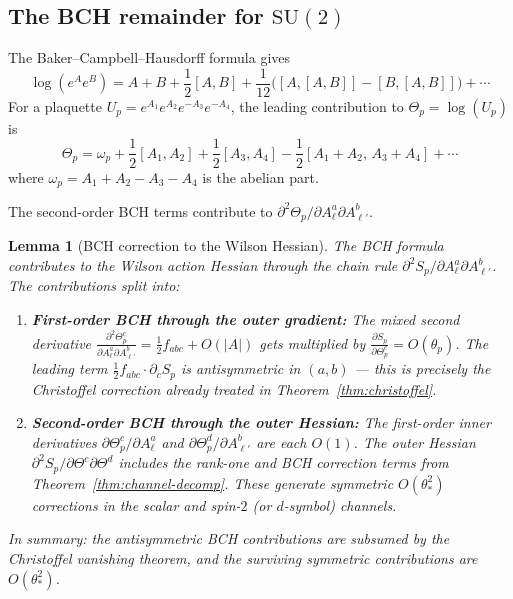 \documentclass[11pt,a4paper]{article}
\theoremstyle{plain}
\newtheorem{lemma}[theorem]{Lemma}
\theoremstyle{definition}
\theoremstyle{remark}
\newcommand{\SU}{\mathrm{SU}}
\begin{document}
\subsection{The BCH remainder for $\SU(2)$}

The Baker--Campbell--Hausdorff formula gives
\begin{equation}
\log(e^A e^B) = A + B + \frac{1}{2}[A,B]
+ \frac{1}{12}\bigl([A,[A,B]] - [B,[A,B]]\bigr) + \cdots
\end{equation}
For a plaquette $U_p = e^{A_1}e^{A_2}e^{-A_3}e^{-A_4}$, the
leading contribution to $\Theta_p = \log(U_p)$ is
\begin{equation}
\Theta_p = \omega_p + \frac{1}{2}[A_1,A_2]
+ \frac{1}{2}[A_3,A_4]
- \frac{1}{2}[A_1+A_2,\,A_3+A_4] + \cdots
\end{equation}
where $\omega_p = A_1 + A_2 - A_3 - A_4$ is the abelian part.

The second-order BCH terms contribute to
$\partial^2\Theta_p/\partial A_\ell^a \partial A_{\ell'}^b$.

\begin{lemma}[BCH correction to the Wilson Hessian]\label{lem:bch-su2}
The BCH formula contributes to the Wilson action Hessian through
the chain rule $\partial^2 S_p / \partial A_\ell^a \partial A_{\ell'}^b$.
The contributions split into:
\begin{enumerate}[label=(\alph*)]
\item \textbf{First-order BCH through the outer gradient:}
  The mixed second derivative
  $\frac{\partial^2\Theta_p^c}{\partial A_\ell^a \partial A_{\ell'}^b}
  = \frac{1}{2}f_{abc} + O(|A|)$ gets multiplied by
  $\frac{\partial S_p}{\partial\Theta_p^c} = O(\theta_p)$.
  The leading term $\frac{1}{2}f_{abc}\cdot\partial_c S_p$ is
  antisymmetric in $(a,b)$ --- this is precisely the Christoffel
  correction already treated in Theorem~\ref{thm:christoffel}.
\item \textbf{Second-order BCH through the outer Hessian:}
  The first-order inner derivatives
  $\partial\Theta_p^c/\partial A_\ell^a$ and
  $\partial\Theta_p^d/\partial A_{\ell'}^b$ are each $O(1)$.
  The outer Hessian
  $\partial^2 S_p/\partial\Theta^c\partial\Theta^d$
  includes the rank-one and BCH correction terms from
  Theorem~\ref{thm:channel-decomp}. These generate symmetric
  $O(\theta_*^2)$ corrections in the scalar and spin-$2$
  (or $d$-symbol) channels.
\end{enumerate}
In summary: the antisymmetric BCH contributions are subsumed by
the Christoffel vanishing theorem, and the surviving symmetric
contributions are $O(\theta_*^2)$.
\end{lemma}
\end{document}
